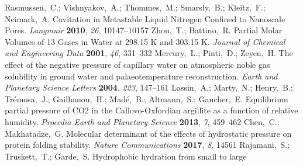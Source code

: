 \documentclass[aps,prl,twocolumn,superscriptaddress,groupedaddress]{revtex4}
\begin{document}
\begin{mcitethebibliography}{88}
\mciteBstWouldAddEndPuncttrue
\mciteSetBstMidEndSepPunct{\mcitedefaultmidpunct}
{\mcitedefaultendpunct}{\mcitedefaultseppunct}\relax
\EndOfBibitem
{}
Rasmussen,~C.; Vishnyakov,~A.; Thommes,~M.; Smarsly,~B.; Kleitz,~F.;
  Neimark,~A. Cavitation in Metastable Liquid Nitrogen Confined to Nanoscale
  Pores. \emph{Langmuir} \textbf{2010}, \emph{26}, 10147--10157\relax
\mciteBstWouldAddEndPuncttrue
\mciteSetBstMidEndSepPunct{\mcitedefaultmidpunct}
{\mcitedefaultendpunct}{\mcitedefaultseppunct}\relax
\EndOfBibitem
{}
Zhou,~T.; Battino,~R. Partial Molar Volumes of 13 Gases in Water at 298.15 K and
  303.15 K. \emph{Journal of Chemical and Engineering Data} \textbf{2001},
  \emph{46}, 331--332\relax
\mciteBstWouldAddEndPuncttrue
\mciteSetBstMidEndSepPunct{\mcitedefaultmidpunct}
{\mcitedefaultendpunct}{\mcitedefaultseppunct}\relax
\EndOfBibitem
{}
Mercury,~L.; Pinti,~D.; Zeyen,~H. The effect of the negative pressure of
  capillary water on atmospheric noble gas solubility in ground water and
  palaeotemperature reconstruction. \emph{Earth and Planetary Science Letters}
  \textbf{2004}, \emph{223}, 147--161\relax
\mciteBstWouldAddEndPuncttrue
\mciteSetBstMidEndSepPunct{\mcitedefaultmidpunct}
{\mcitedefaultendpunct}{\mcitedefaultseppunct}\relax
\EndOfBibitem
{}
Lassin,~A.; Marty,~N.; Henry,~B.; Tr{\'e}mosa,~J.; Gailhanou,~H.; Mad{\'e},~B.;
  Altmann,~S.; Gaucher,~E. Equilibrium partial pressure of CO2 in the
  Callovo-Oxfordian argillite as a function of relative humidity.
  \emph{Procedia Earth and Planetary Science} \textbf{2013}, \emph{7},
  459--462\relax
\mciteBstWouldAddEndPuncttrue
\mciteSetBstMidEndSepPunct{\mcitedefaultmidpunct}
{\mcitedefaultendpunct}{\mcitedefaultseppunct}\relax
\EndOfBibitem
{}
Chen,~C.; Makhatadze,~G. Molecular determinant of the effects of hydrostatic
  pressure on protein folding stability. \emph{Nature Communications}
  \textbf{2017}, \emph{8}, 14561\relax
\mciteBstWouldAddEndPuncttrue
\mciteSetBstMidEndSepPunct{\mcitedefaultmidpunct}
{\mcitedefaultendpunct}{\mcitedefaultseppunct}\relax
\EndOfBibitem
{}
Rajamani,~S.; Truskett,~T.; Garde,~S. Hydrophobic hydration from small to large

\end{mcitethebibliography}
\end{document}

